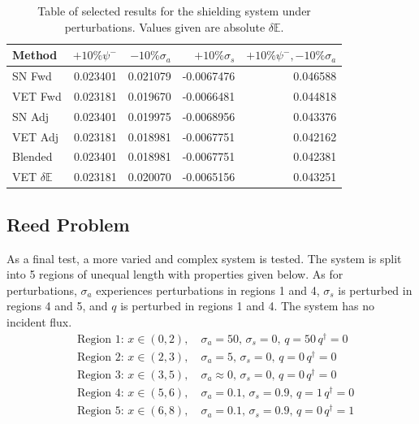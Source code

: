 \documentclass[12pt]{report}
\newcommand{\Edd}{\mathbb{E}}
\newcommand{\sigs}{\sigma_s}
\newcommand{\siga}{\sigma_a}
\begin{document}
\begin{table}[H]
\centering
  \begin{tabular}{| l | r | r | r | r |}
    \hline
    Method  &  $+10\% \psi^- $  & $-10\% \siga $ & $+10\% \sigs $ & $+10\% \psi^-,-10\% \siga$ \\ \hline
     SN Fwd 			&0.023401 &0.021079 &-0.0067476 & 0.046588\\ \hline
     VET Fwd			&0.023181 &0.019670 &-0.0066481 &0.044818\\ \hline
     SN Adj  			&0.023401 &0.019975 &-0.0068956 &0.043376\\ \hline
     VET Adj 			&0.023181 &0.018981 &-0.0067751 &0.042162\\ \hline
     Blended 			&0.023401 &0.018981 &-0.0067751 &0.042381\\ \hline
     VET $\delta \Edd$ 	&0.023181 &0.020070 &-0.0065156 &0.043251\\ \hline
    \end{tabular}
  \caption{Table of selected results for the shielding system under perturbations. Values given are absolute $\delta \Edd$. }
\end{table}

\subsection{Reed Problem}
As a final test, a more varied and complex system is tested. The system is split into 5 regions of unequal length with properties given below. As for perturbations, $\siga$ experiences perturbations in regions 1 and 4, $\sigs$ is perturbed in regions 4 and 5, and $q$ is perturbed in regions 1 and 4. The system has no incident flux.
\begin{equation*}
\begin{split}
&\text{Region 1: } x \in (0,2), \quad \siga=50, \, 			\sigs=0, \, q=50 \, q^\dag=0 \\
&\text{Region 2: } x \in (2,3), \quad \siga=5, \, 			\sigs=0, \, q=0 \, q^\dag=0 \\
&\text{Region 3: } x \in (3,5), \quad \siga \approx 0, \,	\sigs=0, \, q=0 \, q^\dag=0 \\
&\text{Region 4: } x \in (5,6), \quad \siga=0.1, \, 		\sigs=0.9, \, q=1 \, q^\dag=0 \\
&\text{Region 5: } x \in (6,8), \quad \siga=0.1, \, 		\sigs=0.9, \, q=0 \, q^\dag=1 \\
\end{split}
\end{equation*}
\end{document}
